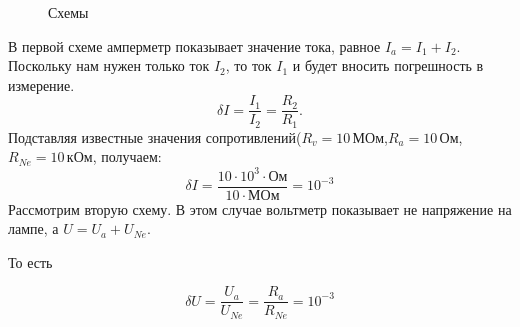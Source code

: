 \begin{figure}[H]
\begin{minipage}[H]{0.49\linewidth}
\end{minipage}
\caption{Схемы}
\end{figure}


В первой схеме амперметр показывает значение тока, равное $I_a=I_1+I_2$. Поскольку нам нужен только ток $I_2$, то ток $I_1$ и будет вносить погрешность в измерение. 
\begin{equation}
\delta I= \frac{I_1}{I_2}=\frac{R_2}{R_1}. 
\end{equation}
Подставляя известные значения сопротивлений($R_v=10\, \text{МОм}$,$R_a=10\, \text{Ом}$,$R_{Ne}=10 \,\text{кОм}$, получаем:
\begin{equation}
\delta I=\frac{10\cdot10^3\cdot\text{Ом}}{10\cdot \text{МОм}}=10^{-3}
\end{equation}
Рассмотрим вторую схему. В этом случае вольтметр  показывает не напряжение на лампе, а $U=U_a+U_{Ne}$.

То есть 

\begin{equation}
 \delta U =\frac{U_a}{U_{Ne}}=\frac{R_a}{R_{Ne}} = 10^{-3} 
\end{equation}

